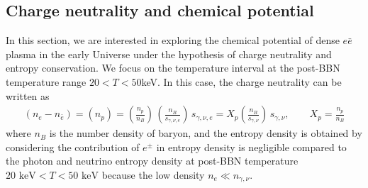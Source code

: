 \documentclass[universe,article,submit,moreauthors,pdftex,a4paper]{Definitions/mdpi}
\newcommand{\keV}{\text{ keV}}
\begin{document}
\subsection{Charge neutrality and chemical potential}
\noindent In this section, we are interested in exploring the chemical potential of dense $e\bar e$ plasma in the early Universe under the hypothesis of charge neutrality and entropy conservation. We focus on the temperature interval at the post-BBN temperature range $20<T<50$keV. In this case, the charge neutrality can be written as
\begin{align}
  \label{density_proton}
  \left(n_{e}-n_{\bar{e}}\right)=(n_{p})=\left(\frac{n_{p}}{n_{B}}\right)\,\left(\frac{n_{B}}{s_{\gamma,\nu,e}}\right)\,s_{\gamma,\nu,e}= X_p\left(\frac{n_B}{s_{\gamma,\nu}}\right)\,s_{\gamma,\nu},\qquad X_p=\frac{n_p}{n_B}
\end{align}
where $n_B$ is the number density of baryon, and the entropy density is obtained by considering the contribution of $e^\pm$ in entropy density is negligible compared to the photon and neutrino entropy density at post-BBN temperature $20\keV<T<50\keV$ because the low density $n_e\ll n_{\gamma,\nu}$. 
\end{document}
